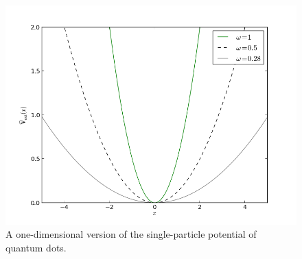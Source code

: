 \begin{frame}
 \begin{figure}
 \begin{center}
  \includegraphics[scale=0.4]{../graphics/Potentials/qdots.png}
  \caption{A one-dimensional version of the single-particle potential of quantum dots.}
  \label{fig:extPotQDOTS}
 \end{center}
\end{figure}
\end{frame}

%  
%  
% 
%  
%  

